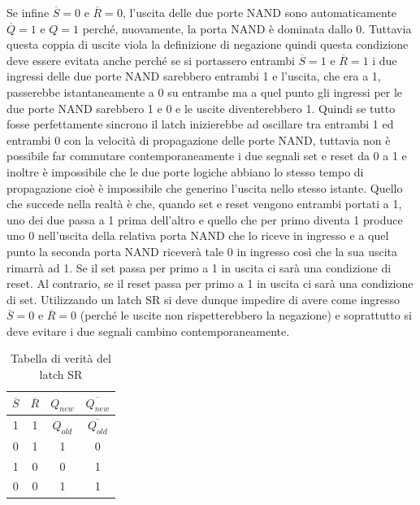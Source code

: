 \documentclass[12pt, a4paper]{report}
\begin{document}
Se infine $\overline{S} = 0$ e $\overline{R} = 0$, l'uscita delle due porte NAND sono automaticamente $\overline{Q} = 1$ e $Q = 1$ perché, nuovamente, la porta NAND è dominata dallo 0. Tuttavia questa coppia di uscite viola la definizione di negazione quindi questa condizione deve essere evitata anche perché se si portassero entrambi $\overline{S} = 1$ e $\overline{R} = 1$ i due ingressi delle due porte NAND sarebbero entrambi 1 e l'uscita, che era a 1, passerebbe istantaneamente a 0 su entrambe ma a quel punto gli ingressi per le due porte NAND sarebbero 1 e 0 e le uscite diventerebbero 1. Quindi se tutto fosse perfettamente sincrono il latch inizierebbe ad oscillare tra entrambi 1 ed entrambi 0 con la velocità di propagazione delle porte NAND, tuttavia non è possibile far commutare contemporaneamente i due segnali set e reset da 0 a 1 e inoltre è impossibile che le due porte logiche abbiano lo stesso tempo di propagazione cioè è impossibile che generino l'uscita nello stesso istante. Quello che succede nella realtà è che, quando set e reset vengono entrambi portati a 1, uno dei due passa a 1 prima dell'altro e quello che per primo diventa 1 produce uno 0 nell'uscita della relativa porta NAND che lo riceve in ingresso e a quel punto la seconda porta NAND riceverà tale 0 in ingresso così che la sua uscita rimarrà ad 1. Se il set passa per primo a 1 in uscita ci sarà una condizione di reset. Al contrario, se il reset passa per primo a 1 in uscita ci sarà una condizione di set. Utilizzando un latch SR si deve dunque impedire di avere come ingresso $\overline{S} = 0$ e $\overline{R} = 0$ (perché le uscite non rispetterebbero la negazione) e soprattutto si deve evitare i due segnali cambino contemporaneamente.
\begin{table}[ht]
    \centering
    \begin{tabular}{c c | c c }
    $\overline{S}$ &$\overline{R}$ &$Q_{new}$ &$\overline{Q_{new}}$\\\hline
    1 &1 &$Q_{old}$ &$\overline{Q_{old}}$\\
    0 &1 &1 &0\\
    1 &0 &0 &1\\
    0 &0 &1 &1
    \end{tabular}
    \caption{Tabella di verità del latch SR}
\end{table}
\end{document}
